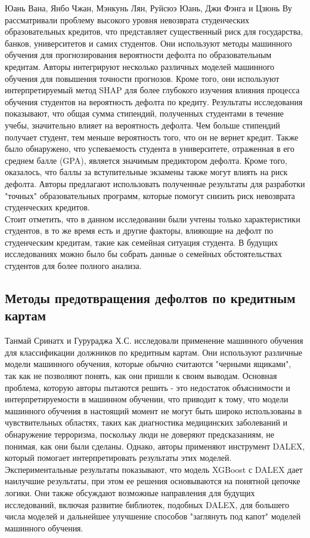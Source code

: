 \documentclass[14pt, letterpaper, twoside]{extarticle}
\begin{document}
Юань Вана, Янбо Чжан, Мэнкунь Лян, Руйсюэ Юань, Джи Фэнга и Цзюнь Ву \cite{wang2023national} рассматривали проблему высокого уровня невозврата студенческих образовательных кредитов, что представляет существенный риск для государства, банков, университетов и самих студентов. Они используют методы машинного обучения для прогнозирования вероятности дефолта по образовательным кредитам.
Авторы интегрируют несколько различных моделей машинного обучения для повышения точности прогнозов. Кроме того, они используют интерпретируемый метод SHAP для более глубокого изучения влияния процесса обучения студентов на вероятность дефолта по кредиту. Результаты исследования показывают, что общая сумма стипендий, полученных студентами в течение учебы, значительно влияет на вероятность дефолта. Чем больше стипендий получает студент, тем меньше вероятность того, что он не вернет кредит. Также было обнаружено, что успеваемость студента в университете, отраженная в его среднем балле (GPA), является значимым предиктором дефолта. Кроме того, оказалось, что баллы за вступительные экзамены также могут влиять на риск дефолта. Авторы предлагают использовать полученные результаты для разработки "точных" образовательных программ, которые помогут снизить риск невозврата студенческих кредитов.\\
\indent Стоит отметить, что в данном исследовании были учтены только характеристики студентов, в то же время есть и другие факторы, влияющие на дефолт по студенческим кредитам, такие как семейная ситуация студента. В будущих исследованиях можно было бы собрать данные о семейных обстоятельствах студентов для более полного анализа.

\subsection{Методы предотвращения дефолтов по кредитным картам}

 Танмай Сринатх и Гурураджа Х.С. \cite{srinath2022explainable} исследовали применение машинного обучения для классификации должников по кредитным картам. Они используют различные модели машинного обучения, которые обычно считаются "черными ящиками", так как не позволяют понять, как они пришли к своим выводам. Основная проблема, которую авторы пытаются решить - это недостаток объяснимости и интерпретируемости в машинном обучении, что приводит к тому, что модели машинного обучения в настоящий момент не могут быть широко использованы в чувствительных областях, таких как диагностика медицинских заболеваний и обнаружение терроризма, поскольку люди не доверяют предсказаниям, не понимая, как они были сделаны. Однако, авторы применяют инструмент DALEX, который помогает интерпретировать результаты этих моделей. Экспериментальные результаты показывают, что модель XGBoost с DALEX дает наилучшие результаты, при этом ее решения основываются на понятной цепочке логики. Они также обсуждают возможные направления для будущих исследований, включая развитие библиотек, подобных DALEX, для большего числа моделей и дальнейшее улучшение способов "заглянуть под капот" моделей машинного обучения. 
\end{document}
